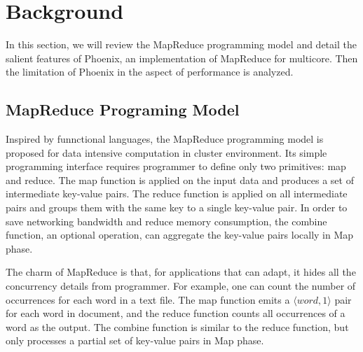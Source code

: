 \section{Background}
\label{sec:back}
In this section, we will review the MapReduce programming
model and detail the salient features of Phoenix, 
an implementation of MapReduce for multicore.
Then the limitation of Phoenix in the aspect of performance is analyzed.

\subsection{MapReduce Programing Model}
Inspired  by funnctional languages, the MapReduce programming model is proposed for data intensive computation in cluster environment.
Its simple programming interface requires programmer to  define only two primitives: map and reduce.
The map function is applied on the input data and produces a set of intermediate key-value pairs.
The reduce function is applied on all intermediate pairs and  groups them with the same key to a single key-value pair. 
In order to save networking bandwidth and reduce memory consumption, the combine function, an optional operation, can aggregate the key-value pairs locally in Map phase.


The charm of MapReduce is that, for applications that can adapt, it hides all the concurrency details from  programmer. 
For example, one can count the number of occurrences for each word in a text file. 
The map function emits a $\langle word, 1\rangle$ pair for each word in document, and the reduce function counts all occurrences of a word as the output. 
The combine function is similar to the reduce function, but only processes a partial set of key-value pairs in Map phase.



